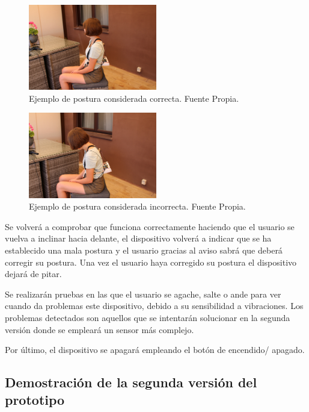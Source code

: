 \begin{figure}[h!]
    \centering
    \includegraphics[width=0.5\textwidth]{img/V1_PosCor.jpg}
    \caption{Ejemplo de postura considerada correcta. Fuente Propia.}
    \label{fig:imgV1_posturaCorr} 
\end{figure}

\begin{figure}[h!]
    \centering
    \includegraphics[width=0.5\textwidth]{img/V1_PosInc.jpg}
    \caption{Ejemplo de postura considerada incorrecta. Fuente Propia.}
    \label{fig:imgV1_posturaInc} 
\end{figure}


Se volverá a comprobar que funciona correctamente haciendo que el usuario se vuelva a inclinar hacia delante, el dispositivo volverá a indicar que se ha establecido una mala postura y el usuario gracias al aviso sabrá que deberá corregir su postura. Una vez el usuario haya corregido su postura el dispositivo dejará de pitar.

Se realizarán pruebas en las que el usuario se agache, salte o ande para ver cuando da problemas este dispositivo, debido a su sensibilidad a vibraciones. Los problemas detectados son aquellos que se intentarán solucionar en la segunda versión donde se empleará un sensor más complejo.

Por último, el dispositivo se apagará empleando el botón de encendido/ apagado.


\subsection{Demostración de la segunda versión del prototipo}

